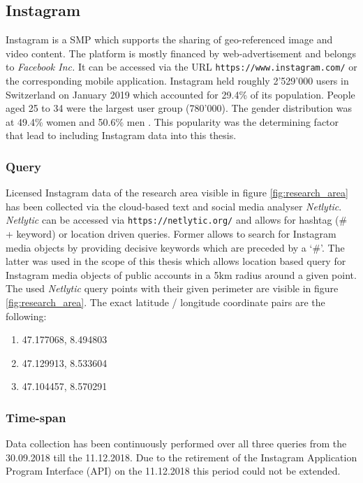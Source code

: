 \subsection{Instagram} \label{instagram}
Instagram is a SMP which supports the sharing of geo-referenced image and video content. The platform is mostly financed by web-advertisement and belongs to \textit{Facebook Inc.} It can be accessed via the URL \texttt{https://www.instagram.com/} or the corresponding mobile application.
Instagram held roughly 2\rq529\rq000 users in Switzerland on January 2019 which accounted for 29.4\% of its population. People aged 25 to 34 were the largest user group (780\rq 000). The gender distribution was at 49.4\% women and 50.6\% men \cite{NapoleonCat2019NoTitle}. This popularity was the determining factor that lead to including Instagram data into this thesis.\\

\subsubsection{Query} \label{netlytic}
Licensed Instagram data of the research area visible in figure \ref{fig:research_area} has been collected via the cloud-based text and social media analyser \textit{Netlytic}. \textit{Netlytic} can be accessed via \texttt{https://netlytic.org/} and allows for hashtag (\# + keyword) or location driven queries. Former allows to search for Instagram media objects by providing decisive keywords which are preceded by a \lq \#\rq. The latter was used in the scope of this thesis which allows location based query for Instagram media objects of public accounts in a 5km radius around a given point. The used \textit{Netlytic} query points with their given perimeter are visible in figure \ref{fig:research_area}. The exact latitude / longitude coordinate pairs are the following:\\
\begin{enumerate}
  \item 47.177068, 8.494803
  \item 47.129913, 8.533604
  \item 47.104457, 8.570291
\end{enumerate}

\subsubsection{Time-span} \label{Instagram_timespan}
Data collection has been continuously performed over all three queries from the 30.09.2018 till the 11.12.2018. Due to the retirement of the Instagram Application Program Interface (API) on the 11.12.2018 \cite{Instagram2018InstagramRetirement} this period could not be extended.

